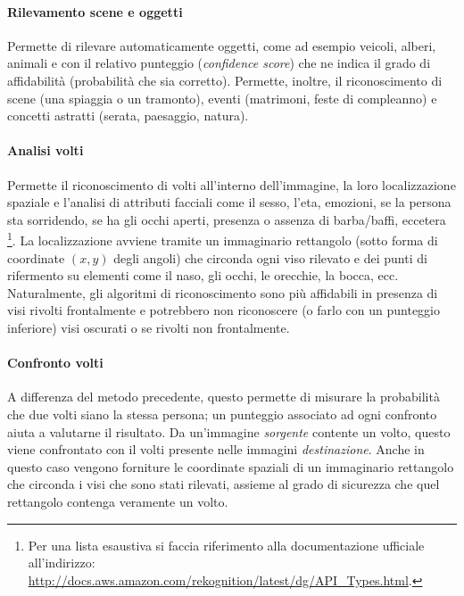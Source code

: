 \paragraph{Rilevamento scene e oggetti} Permette di rilevare automaticamente oggetti, come ad esempio veicoli, alberi, animali e con il relativo punteggio
(\textit{confidence score}) che ne indica il grado di affidabilità (probabilità che sia corretto).
Permette, inoltre, il riconoscimento di scene (una spiaggia o un tramonto), eventi (matrimoni, feste di compleanno) e concetti astratti (serata, paesaggio, natura).

\paragraph{Analisi volti} Permette il riconoscimento di volti all'interno dell'immagine, la loro localizzazione spaziale e l'analisi di attributi facciali come
il sesso, l'eta, emozioni, se la persona sta sorridendo, se ha gli occhi aperti, presenza o assenza di barba/baffi, eccetera
\footnote{Per una lista esaustiva si faccia riferimento alla documentazione ufficiale all'indirizzo: \url{http://docs.aws.amazon.com/rekognition/latest/dg/API_Types.html}.}.
La localizzazione avviene tramite un immaginario rettangolo (sotto forma di coordinate $(x, y)$ degli angoli) che circonda ogni viso rilevato e dei punti di rifermento su elementi come il naso,
gli occhi, le orecchie, la bocca, ecc.
Naturalmente, gli algoritmi di riconoscimento sono più affidabili in presenza di visi rivolti frontalmente e potrebbero non riconoscere (o farlo con un punteggio inferiore) visi oscurati
o se rivolti non frontalmente.

\paragraph{Confronto volti} A differenza del metodo precedente, questo permette di misurare la probabilità che due volti siano la stessa persona; un punteggio associato ad ogni confronto
aiuta a valutarne il risultato.
Da un'immagine \textit{sorgente} contente un volto, questo viene confrontato con il volti presente nelle immagini \textit{destinazione}.
Anche in questo caso vengono forniture le coordinate spaziali di un immaginario rettangolo che circonda i visi che sono stati rilevati, assieme al grado di sicurezza che quel rettangolo contenga veramente un volto.

